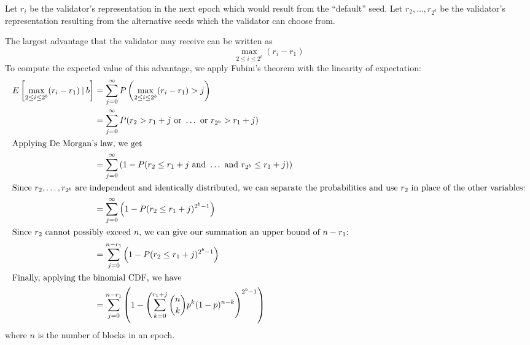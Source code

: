 Let $r_i$ be the validator's representation in the next epoch which would result from the ``default'' seed. Let $r_2, \dots, r_{2^b}$ be the validator's representation resulting from the alternative seeds which the validator can choose from.

The largest advantage that the validator may receive can be written as
\[ \max_{2 \le i \le 2^b}(r_i - r_1) \]
To compute the expected value of this advantage, we apply Fubini's theorem with the linearity of expectation:
\begin{align*}
E\left[ \max_{2 \le i \le 2^b}(r_i - r_1) \mathbin{\vert} b \right] &= \sum_{j=0}^{\infty} P\left( \max_{2 \le i \le 2^b}(r_i - r_1) > j \right) \\
&= \sum_{j=0}^{\infty} P(r_2 > r_1 + j \text{ or } \dots \text { or } r_{2^b} > r_1 + j) \\
\intertext{Applying De Morgan's law, we get}
&= \sum_{j=0}^{\infty} \left( 1 - P(r_2 \le r_1 + j \text{ and } \dots \text { and } r_{2^b} \le r_1 + j) \right) \\
\intertext{Since $r_2, \dots, r_{2^b}$ are independent and identically distributed, we can separate the probabilities and use $r_2$ in place of the other variables:}
&= \sum_{j=0}^{\infty} \left( 1 - P(r_2 \le r_1 + j)^{2^b - 1} \right) \\
\intertext{Since $r_2$ cannot possibly exceed $n$, we can give our summation an upper bound of $n - r_1$:}
&= \sum_{j=0}^{n - r_1} \left( 1 - P(r_2 \le r_1 + j)^{2^b - 1} \right) \\
\intertext{Finally, applying the binomial CDF, we have}
&= \sum_{j=0}^{n - r_1} \left( 1 - \left( \sum_{k=0}^{r_1 + j} \binom{n}{k} p^k (1-p)^{n-k} \right)^{2^b - 1} \right)
\end{align*}
where $n$ is the number of blocks in an epoch.

